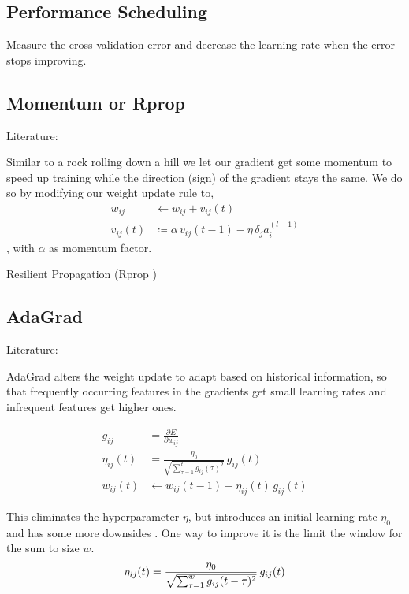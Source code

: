 \subsection{Performance Scheduling}
Measure the cross validation error and decrease the learning rate when the error stops improving.

\subsection{Momentum or Rprop}\label{sec:momentum}
Literature: \cite{Riedmiller1994}

Similar to a rock rolling down a hill we let our gradient get some momentum to speed up training while the direction (sign) of the gradient stays the same. We do so by modifying our weight update rule to,
\begin{align}\label{eq:momentum}
w_{ij} &\leftarrow w_{ij} + v_{ij}(t)\\
v_{ij}(t) &\coloneqq \alpha\, v_{ij}(t-1) - \eta\, \delta_j a_i^{(l-1)}
\end{align}
, with $\alpha$ as momentum factor.

Resilient Propagation (Rprop
)

\subsection{AdaGrad}
Literature: \cite{Zeiler2012,Duchi2011,Dyer}

AdaGrad alters the weight update to adapt based on historical information, so that frequently occurring features in the gradients get small learning rates and infrequent features get higher ones.

\begin{align}
g_{ij} &= \frac{\partial E}{\partial w_{ij}}\\
\eta_{ij}(t) &= \frac{\eta_0}{\sqrt{\sum_{\tau=1}^t g_{ij}(\tau)^2}}\,g_{ij}(t)\\
w_{ij}(t) &\leftarrow w_{ij}(t-1) - \eta_{ij}(t)\,g_{ij}(t)
\end{align}

This eliminates the hyperparameter $\eta$, but introduces an initial learning rate $\eta_0$ and has some more downsides \cite{Zeiler2012}. One way to improve it is the limit the window for the sum to size $w$.
\begin{equation}
\eta_{ij}(t) = \frac{\eta_0}{\sqrt{\sum_{\tau=1}^w g_{ij}(t-\tau)^2}}\,g_{ij}(t)\\
\end{equation}

